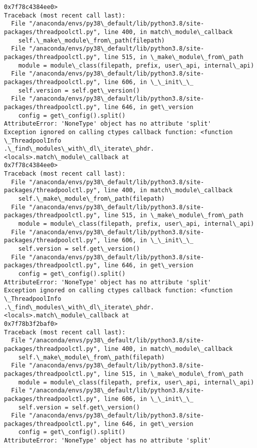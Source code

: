 \documentclass[11pt]{article}
\begin{document}
\begin{Verbatim}[commandchars=\\\{\}]
0x7f78c4384ee0>
Traceback (most recent call last):
  File "/anaconda/envs/py38\_default/lib/python3.8/site-
packages/threadpoolctl.py", line 400, in match\_module\_callback
    self.\_make\_module\_from\_path(filepath)
  File "/anaconda/envs/py38\_default/lib/python3.8/site-
packages/threadpoolctl.py", line 515, in \_make\_module\_from\_path
    module = module\_class(filepath, prefix, user\_api, internal\_api)
  File "/anaconda/envs/py38\_default/lib/python3.8/site-
packages/threadpoolctl.py", line 606, in \_\_init\_\_
    self.version = self.get\_version()
  File "/anaconda/envs/py38\_default/lib/python3.8/site-
packages/threadpoolctl.py", line 646, in get\_version
    config = get\_config().split()
AttributeError: 'NoneType' object has no attribute 'split'
Exception ignored on calling ctypes callback function: <function \_ThreadpoolInfo
.\_find\_modules\_with\_dl\_iterate\_phdr.<locals>.match\_module\_callback at
0x7f78c4384ee0>
Traceback (most recent call last):
  File "/anaconda/envs/py38\_default/lib/python3.8/site-
packages/threadpoolctl.py", line 400, in match\_module\_callback
    self.\_make\_module\_from\_path(filepath)
  File "/anaconda/envs/py38\_default/lib/python3.8/site-
packages/threadpoolctl.py", line 515, in \_make\_module\_from\_path
    module = module\_class(filepath, prefix, user\_api, internal\_api)
  File "/anaconda/envs/py38\_default/lib/python3.8/site-
packages/threadpoolctl.py", line 606, in \_\_init\_\_
    self.version = self.get\_version()
  File "/anaconda/envs/py38\_default/lib/python3.8/site-
packages/threadpoolctl.py", line 646, in get\_version
    config = get\_config().split()
AttributeError: 'NoneType' object has no attribute 'split'
Exception ignored on calling ctypes callback function: <function \_ThreadpoolInfo
.\_find\_modules\_with\_dl\_iterate\_phdr.<locals>.match\_module\_callback at
0x7f78b3f2baf0>
Traceback (most recent call last):
  File "/anaconda/envs/py38\_default/lib/python3.8/site-
packages/threadpoolctl.py", line 400, in match\_module\_callback
    self.\_make\_module\_from\_path(filepath)
  File "/anaconda/envs/py38\_default/lib/python3.8/site-
packages/threadpoolctl.py", line 515, in \_make\_module\_from\_path
    module = module\_class(filepath, prefix, user\_api, internal\_api)
  File "/anaconda/envs/py38\_default/lib/python3.8/site-
packages/threadpoolctl.py", line 606, in \_\_init\_\_
    self.version = self.get\_version()
  File "/anaconda/envs/py38\_default/lib/python3.8/site-
packages/threadpoolctl.py", line 646, in get\_version
    config = get\_config().split()
AttributeError: 'NoneType' object has no attribute 'split'

\end{Verbatim}
\end{document}
